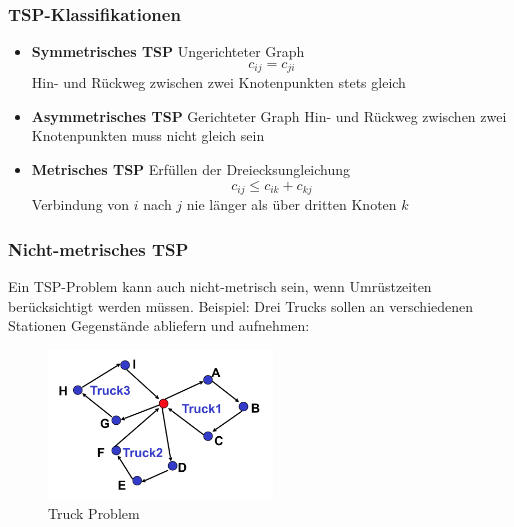 \documentclass[handout]{beamer}
\begin{document}
  \begin{frame}
    \frametitle{TSP-Klassifikationen}
    \begin{itemize}[<+->]
      \item \textbf{Symmetrisches TSP}
        \linebreak
        Ungerichteter Graph
        $$c_{ij} = c_{ji}$$
        Hin- und Rückweg zwischen zwei Knotenpunkten stets gleich
      \item \textbf{Asymmetrisches TSP}
        \linebreak
        Gerichteter Graph
        Hin- und Rückweg zwischen zwei Knotenpunkten muss nicht gleich sein
      \item \textbf{Metrisches TSP}
        \linebreak
        Erfüllen der Dreiecksungleichung
        $$c_{ij} \le c_{ik} + c_{kj}$$
        Verbindung von $i$ nach $j$ nie länger als über dritten Knoten $k$
    \end{itemize}
  \end{frame}

  \begin{frame}
    \frametitle{Nicht-metrisches TSP}
    Ein TSP-Problem kann auch nicht-metrisch sein, wenn Umrüstzeiten
    berücksichtigt werden müssen.
    \pause
    \linebreak
    Beispiel: Drei Trucks sollen an verschiedenen Stationen Gegenstände
    abliefern und aufnehmen:
    \begin{figure}
      \centering
      \includegraphics[width=\linewidth,height=150px,keepaspectratio]{truck_problem.png}
      \caption{Truck Problem}
    \end{figure}
  \end{frame}
\end{document}
